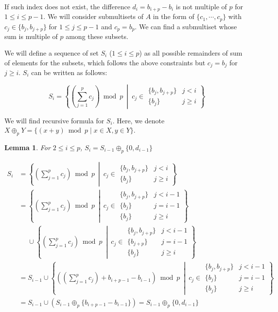 \documentclass[11pt]{article}
\newtheorem{lemma}{Lemma}
\begin{document}
If such index does not exist, the difference $d_i = b_{i+p} - b_i$ is not multiple of $p$ for $1 \le i \le p-1$. We will consider submultisets of $A$ in the form of $\{c_1, \cdots, c_p\}$ with $c_j \in \{b_j, b_{j+p}\}$ for $1 \le j \le p-1$ and $c_p=b_p$. We can find a submultiset whose sum is multiple of $p$ among these subsets.

We will define a sequence of set $S_i$ ($1 \le i \le p$) as all possible remainders of sum of elements for the subsets, which follows the above constraints but $c_j=b_j$ for $j \ge i$. $S_i$ can be written as follows:

$$ S_i = \left\{\left(\sum_{j=1}^p c_j\right) \bmod p \ \middle|\ c_j \in \begin{array}{ll}
\{b_j, b_{j+p}\} & j < i \\
\{b_j\} & j \ge i
\end{array}
\right\}$$

We will find recursive formula for $S_i$. Here, we denote $X \oplus_p Y = \{(x+y) \bmod p \mid x \in X, y \in Y \} $.

\begin{lemma}
    For $2 \le i \le p$, $S_i =  S_{i-1} \oplus_p \{0, d_{i-1}\} $
\end{lemma}

\begin{align*}
S_i  & = \left\{\left(\sum_{j=1}^p c_j\right) \bmod p \ \middle|\ c_j \in \begin{array}{ll}
\{b_j, b_{j+p}\} & j < i \\
\{b_j\} & j \ge i
\end{array} 
\right\} \\ 
\ & = \left\{\left(\sum_{j=1}^p c_j\right) \bmod p \ \middle|\ c_j \in \begin{array}{ll}
\{b_j, b_{j+p}\} & j < i-1 \\
\{b_j\} & j = i-1 \\
\{b_j\} & j \ge i
\end{array}
\right\} \\ 
\ & \phantom{=} \cup \left\{\left(\sum_{j=1}^p c_j\right) \bmod p \ \middle|\ c_j \in \begin{array}{ll}
\{b_j, b_{j+p}\} & j < i-1 \\
\{b_{j+p}\} & j = i-1 \\
\{b_j\} & j \ge i
\end{array}
\right\} \\
\ & = S_{i-1} \cup \left\{\left(\left(\sum_{j=1}^p c_j\right) + b_{i+p-1}-b_{i-1}\right) \bmod p \ \middle|\ c_j \in \begin{array}{ll}
\{b_j, b_{j+p}\} & j < i-1 \\
\{b_j\} & j = i-1 \\
\{b_j\} & j \ge i
\end{array}
\right\} \\ 
\ & = S_{i-1} \cup (S_{i-1} \oplus_p \{b_{i+p-1}-b_{i-1}\}) = S_{i-1} \oplus_p \{0, d_{i-1}\} 
\end{align*}
\end{document}
